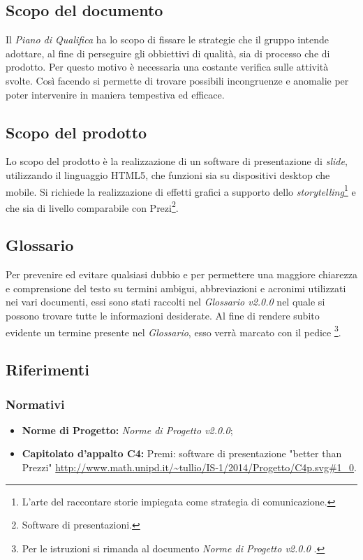 \subsection{Scopo del documento}
Il \textit{Piano di Qualifica} ha lo scopo di fissare le strategie che il gruppo intende adottare, al fine di perseguire gli obbiettivi di qualità, sia di processo che di prodotto. Per questo motivo è necessaria una costante verifica sulle attività svolte. Così facendo si permette di trovare possibili incongruenze e anomalie per poter intervenire in maniera tempestiva ed efficace.
\subsection{Scopo del prodotto}
Lo scopo del prodotto è la realizzazione di un software di presentazione di \textit{\gls{slide}}, utilizzando il linguaggio \gls{HTML5}, che funzioni sia su dispositivi desktop che mobile. Si richiede la realizzazione di effetti grafici a supporto dello \textit{storytelling}\footnote{L'arte del raccontare storie impiegata come strategia di comunicazione.} e che sia di livello comparabile con Prezi\footnote{Software di presentazioni.}.
\subsection{Glossario}
Per prevenire ed evitare qualsiasi dubbio e per permettere una maggiore chiarezza e comprensione del testo su termini ambigui, abbreviazioni e acronimi utilizzati nei vari documenti, essi sono stati raccolti nel \textit{Glossario v2.0.0} nel quale si possono trovare tutte le informazioni desiderate.
Al fine di rendere subito evidente un termine presente nel \textit{Glossario}, esso verrà marcato con il pedice \G\footnote{Per le istruzioni si rimanda al documento \textit{Norme di Progetto v2.0.0} .}.
\subsection{Riferimenti}
	\subsubsection{Normativi}
	\begin{itemize}
		\item \textbf{Norme di Progetto:} \textit{Norme di Progetto v2.0.0};
		\item \textbf{Capitolato d'appalto C4:} Premi: software di presentazione "better than Prezzi" \url{http://www.math.unipd.it/~tullio/IS-1/2014/Progetto/C4p.svg#1_0}.
	\end{itemize}
